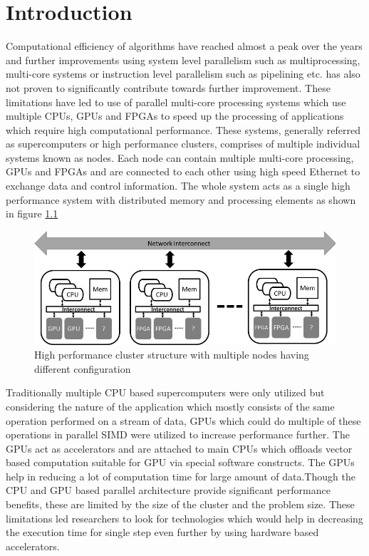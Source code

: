 \chapter{Introduction}
\label{cha:Introduction}

Computational efficiency of algorithms have reached almost a peak over the years
and further improvements using system level parallelism such as multiprocessing, multi-core systems
or instruction level parallelism such as pipelining etc. has also not proven to significantly contribute
towards further improvement. These limitations have led to use of parallel multi-core processing
systems which use multiple CPUs, GPUs and FPGAs to speed up the processing of applications
which require high computational performance. These systems, generally referred as supercomputers or
high performance clusters, comprises of multiple individual systems known as nodes. Each node
can contain multiple multi-core processing, GPUs and FPGAs and are connected to each other
using high speed Ethernet to exchange data and control information. The whole system acts
as a single high performance system with distributed memory and processing elements as
shown in figure \ref{fig:cluster}

\begin{figure}[ht]%
    \centering
    \includegraphics[width=1.0\textwidth]{images/cluster}
    \caption{High performance cluster structure with multiple nodes having different configuration}
    \label{fig:cluster}
\end{figure}

Traditionally multiple CPU based supercomputers were only utilized but considering the nature
of the application which mostly consists of the same operation performed on a stream of data,
GPUs which could do multiple of these operations in parallel \ac{SIMD} were utilized
to increase performance further. The GPUs act as accelerators and are attached to main CPUs
which offloads vector based computation suitable for GPU via special software constructs.
The GPUs help in reducing a lot of computation time for large amount of data.Though the CPU
and GPU based parallel architecture provide significant performance benefits,
these are limited by the size of the cluster and the problem size. These limitations led
researchers to look for technologies which would help in decreasing the execution time for
single step even further by using hardware based accelerators.

